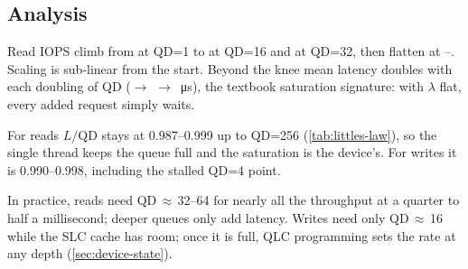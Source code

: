 \subsection{Analysis}
Read IOPS climb from  at QD=1 to
 at QD=16 and
 at QD=32, then flatten at
--.
Scaling is sub-linear from the start. Beyond the knee mean latency doubles with each doubling of QD
($\to$%
$\to$%
\,\si{\micro\second}), the textbook
saturation signature: with $\lambda$ flat, every added request simply waits.

For reads $L/\text{QD}$ stays at 0.987--0.999 up to QD=256 (\cref{tab:littles-law}), so the single
 thread keeps the queue full and the saturation is the device's. For writes it is
0.990--0.998, including the stalled QD=4 point.

In practice, reads need QD\,$\approx$\,32--64 for nearly all the throughput at a quarter to half a
millisecond; deeper queues only add latency. Writes need only QD\,$\approx$\,16 while the SLC cache has
room; once it is full, QLC programming sets the rate at any depth (\cref{sec:device-state}).
